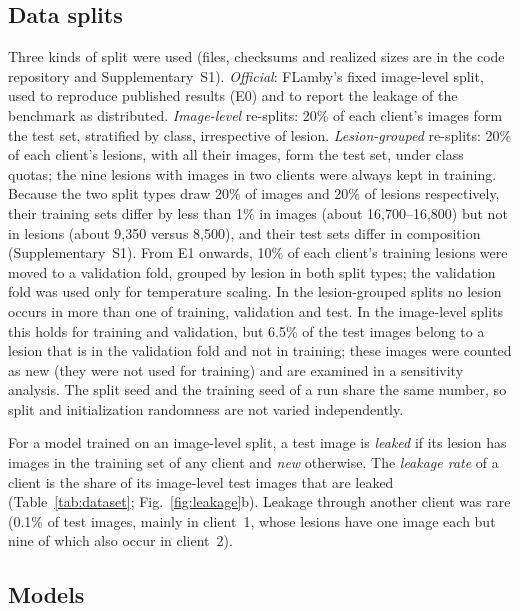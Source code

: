 \documentclass[VANCOUVER,Times1COL]{WileyNJDv5}
\begin{document}
\subsection{Data splits}
\label{sec:splits}

Three kinds of split were used (files, checksums and realized sizes are in the code repository and
Supplementary~S1).
\emph{Official}: FLamby's fixed image-level split, used to reproduce published results (E0) and to
report the leakage of the benchmark as distributed.
\emph{Image-level} re-splits: 20\% of each client's images form the test set, stratified by class,
irrespective of lesion.
\emph{Lesion-grouped} re-splits: 20\% of each client's lesions, with all their images, form the test set,
under class quotas; the nine lesions with images in two clients were always kept in training. Because the
two split types draw 20\% of images and 20\% of lesions respectively, their training sets differ by less
than 1\% in images (about 16,700--16,800) but not in lesions (about 9,350 versus 8,500), and their test
sets differ in composition (Supplementary~S1). From E1 onwards, 10\% of each client's training lesions
were moved to a validation fold, grouped by lesion in both split types; the validation fold was used only
for temperature scaling. In the lesion-grouped splits no lesion occurs in more than one of training,
validation and test. In the image-level splits this holds for training and validation, but 6.5\% of the
test images belong to a lesion that is in the validation fold and not in training; these images were
counted as new (they were not used for training) and are examined in a sensitivity analysis. The split
seed and the training seed of a run share the same number, so split and initialization randomness are not
varied independently.

For a model trained on an image-level split, a test image is \emph{leaked} if its lesion has images in
the training set of any client and \emph{new} otherwise. The \emph{leakage rate} of a client is the
share of its image-level test images that are leaked (Table~\ref{tab:dataset}; Fig.~\ref{fig:leakage}b).
Leakage through another client was rare (0.1\% of test images, mainly in client~1, whose lesions have
one image each but nine of which also occur in client~2).

\subsection{Models}
\label{sec:models}
\end{document}
